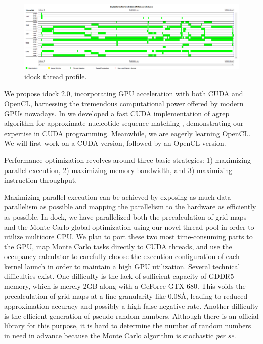 \begin{figure}
\centering
\includegraphics[width=\textwidth]{idock/ThreadProfile.png}
\caption{idock thread profile.}
\label{idock:ThreadProfile}
\end{figure}

We propose idock 2.0, incorporating GPU acceleration with both CUDA and OpenCL, harnessing the tremendous computational power offered by modern GPUs nowadays. In \citeyear{1138} we developed a fast CUDA implementation of agrep algorithm for approximate nucleotide sequence matching \citep{1138}, demonstrating our expertise in CUDA programming. Meanwhile, we are eagerly learning OpenCL. We will first work on a CUDA version, followed by an OpenCL version.

Performance optimization revolves around three basic strategies: 1) maximizing parallel execution, 2) maximizing memory bandwidth, and 3) maximizing instruction throughput.

Maximizing parallel execution can be achieved by exposing as much data parallelism as possible and mapping the parallelism to the hardware as efficiently as possible. In dock, we have parallelized both the precalculation of grid maps and the Monte Carlo global optimization using our novel thread pool in order to utilize multicore CPU. We plan to port these two most time-consuming parts to the GPU, map Monte Carlo tasks directly to CUDA threads, and use the occupancy calculator to carefully choose the execution configuration of each kernel launch in order to maintain a high GPU utilization. Several technical difficulties exist. One difficulty is the lack of sufficient capacity of GDDR5 memory, which is merely 2GB along with a GeForce GTX 680. This voids the precalculation of grid maps at a fine granularity like 0.08\AA, leading to reduced approximation accuracy and possibly a high false negative rate. Another difficulty is the efficient generation of pseudo random numbers. Although there is an official library for this purpose, it is hard to determine the number of random numbers in need in advance because the Monte Carlo algorithm is stochastic \textit{per se}.

